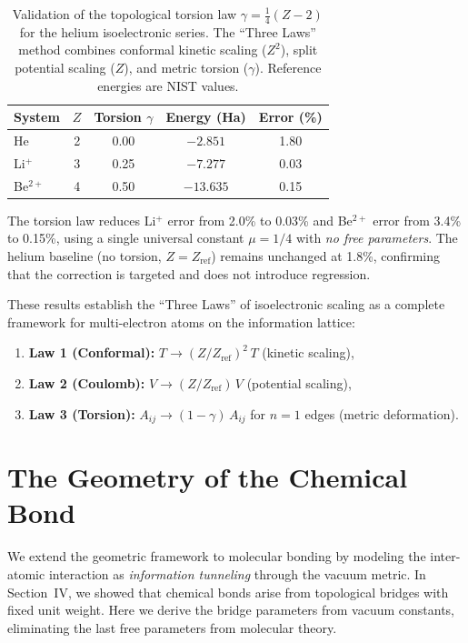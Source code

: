 \documentclass[aps,prd,twocolumn,superscriptaddress,groupedaddress,showpacs]{revtex4-2}
\begin{document}
\begin{table}[h]
\centering
\caption{Validation of the topological torsion law $\gamma = \frac{1}{4}(Z - 2)$ for the helium isoelectronic series. The ``Three Laws'' method combines conformal kinetic scaling ($Z^2$), split potential scaling ($Z$), and metric torsion ($\gamma$). Reference energies are NIST values.}
\label{tab:torsion_validation}
\begin{tabular}{lcccc}
\toprule
System & $Z$ & Torsion $\gamma$ & Energy (Ha) & Error (\%) \\
\midrule
He       & 2 & 0.00 & $-2.851$ & 1.80 \\
Li$^+$   & 3 & 0.25 & $-7.277$ & 0.03 \\
Be$^{2+}$ & 4 & 0.50 & $-13.635$ & 0.15 \\
\bottomrule
\end{tabular}
\end{table}

The torsion law reduces Li$^+$ error from 2.0\% to 0.03\% and Be$^{2+}$ error from 3.4\% to 0.15\%, using a single universal constant $\mu = 1/4$ with \emph{no free parameters}. The helium baseline (no torsion, $Z = Z_{\text{ref}}$) remains unchanged at 1.8\%, confirming that the correction is targeted and does not introduce regression.

These results establish the ``Three Laws'' of isoelectronic scaling as a complete framework for multi-electron atoms on the information lattice:
\begin{enumerate}
\item \textbf{Law 1 (Conformal):} $T \to (Z/Z_{\text{ref}})^2 \, T$ \quad (kinetic scaling),
\item \textbf{Law 2 (Coulomb):} $V \to (Z/Z_{\text{ref}}) \, V$ \quad (potential scaling),
\item \textbf{Law 3 (Torsion):} $A_{ij} \to (1 - \gamma) \, A_{ij}$ for $n=1$ edges \quad (metric deformation).
\end{enumerate}

\section{The Geometry of the Chemical Bond}
\label{sec:chemical_bond}

We extend the geometric framework to molecular bonding by modeling the inter-atomic interaction as \emph{information tunneling} through the vacuum metric. In Section~IV, we showed that chemical bonds arise from topological bridges with fixed unit weight. Here we derive the bridge parameters from vacuum constants, eliminating the last free parameters from molecular theory.
\end{document}
